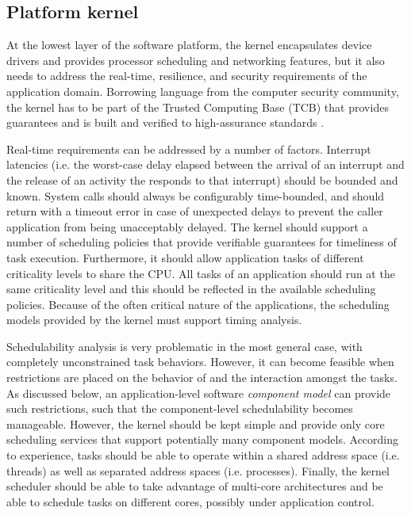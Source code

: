 \subsection{Platform kernel}

At the lowest layer of the software platform, the kernel  encapsulates device drivers and provides processor scheduling and
networking features, but it also needs to address the real-time,
resilience, and security requirements of the application
domain. Borrowing language from the computer security community, the
kernel has to be part of the Trusted Computing Base (TCB) that
provides guarantees and is built and verified to high-assurance standards
\cite{Rushby84atrusted}.

Real-time requirements can be addressed by a number of
factors. Interrupt latencies (i.e. the worst-case delay elapsed
between the arrival of an interrupt and the release of an activity the
responds to that interrupt) should be bounded and known. System calls
should always be configurably time-bounded, and should return with a 
timeout error in case of unexpected delays to prevent the caller application from 
being unacceptably delayed.  The kernel should support a number of
scheduling policies that provide verifiable guarantees for timeliness
of task execution. Furthermore, it should allow application tasks of
different criticality levels to share the CPU. All tasks of an
application should run at the same criticality level and this should
be reflected in the available scheduling policies.  Because of the
often critical nature of the applications, the scheduling models
provided by the kernel must support timing analysis.

Schedulability analysis is very problematic in the most general case, with
completely unconstrained task behaviors. However, it can become feasible
when restrictions are placed on the behavior of and the interaction
amongst the tasks. As discussed below, an application-level software
\textit{component model} can provide such restrictions, such that the
component-level schedulability becomes manageable. However, the kernel
should be kept simple and provide only core scheduling services that
support potentially many component models. According to experience,
tasks should be able to operate within a shared address space
(i.e. threads) as well as separated address spaces
(i.e. processes). Finally, the kernel scheduler should be able to take
advantage of multi-core architectures and be able to schedule tasks
on different cores, possibly under application control.

